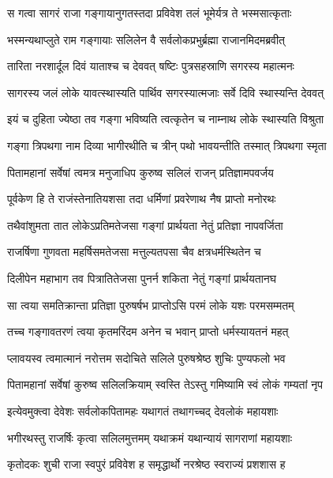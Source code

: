 
\twolineshloka
{स गत्वा सागरं राजा गङ्गायानुगतस्तदा}
{प्रविवेश तलं भूमेर्यत्र ते भस्मसात्कृताः} %

\twolineshloka
{भस्मन्यथाप्लुते राम गङ्गायाः सलिलेन वै}
{सर्वलोकप्रभुर्ब्रह्मा राजानमिदमब्रवीत्} %

\twolineshloka
{तारिता नरशार्दूल दिवं याताश्च च देववत्}
{षष्टिः पुत्रसहस्राणि सगरस्य महात्मनः} %

\twolineshloka
{सागरस्य जलं लोके यावत्स्थास्यति पार्थिव}
{सगरस्यात्मजाः सर्वे दिवि स्थास्यन्ति देववत्} %

\twolineshloka
{इयं च दुहिता ज्येष्ठा तव गङ्गा भविष्यति}
{त्वत्कृतेन च नाम्नाथ लोके स्थास्यति विश्रुता} %

\twolineshloka
{गङ्गा त्रिपथगा नाम दिव्या भागीरथीति च}
{त्रीन् पथो भावयन्तीति तस्मात् त्रिपथगा स्मृता} %

\twolineshloka
{पितामहानां सर्वेषां त्वमत्र मनुजाधिप}
{कुरुष्व सलिलं राजन् प्रतिज्ञामपवर्जय} %

\twolineshloka
{पूर्वकेण हि ते राजंस्तेनातियशसा तदा}
{धर्मिणां प्रवरेणाथ नैष प्राप्तो मनोरथः} %

\twolineshloka
{तथैवांशुमता तात लोकेऽप्रतिमतेजसा}
{गङ्गां प्रार्थयता नेतुं प्रतिज्ञा नापवर्जिता} %

\twolineshloka
{राजर्षिणा गुणवता महर्षिसमतेजसा}
{मत्तुल्यतपसा चैव क्षत्रधर्मस्थितेन च} %

\twolineshloka
{दिलीपेन महाभाग तव पित्रातितेजसा}
{पुनर्न शकिता नेतुं गङ्गां प्रार्थयतानघ} %

\twolineshloka
{सा त्वया समतिक्रान्ता प्रतिज्ञा पुरुषर्षभ}
{प्राप्तोऽसि परमं लोके यशः परमसम्मतम्} %

\twolineshloka
{तच्च गङ्गावतरणं त्वया कृतमरिंदम}
{अनेन च भवान् प्राप्तो धर्मस्यायतनं महत्} %

\twolineshloka
{प्लावयस्व त्वमात्मानं नरोत्तम सदोचिते}
{सलिले पुरुषश्रेष्ठ शुचिः पुण्यफलो भव} %

\twolineshloka
{पितामहानां सर्वेषां कुरुष्व सलिलक्रियाम्}
{स्वस्ति तेऽस्तु गमिष्यामि स्वं लोकं गम्यतां नृप} %

\twolineshloka
{इत्येवमुक्त्वा देवेशः सर्वलोकपितामहः}
{यथागतं तथागच्चद् देवलोकं महायशाः} %

\twolineshloka
{भगीरथस्तु राजर्षिः कृत्वा सलिलमुत्तमम्}
{यथाक्रमं यथान्यायं सागराणां महायशाः} %

\twolineshloka
{कृतोदकः शुची राजा स्वपुरं प्रविवेश ह}
{समृद्धार्थो नरश्रेष्ठ स्वराज्यं प्रशशास ह} %

